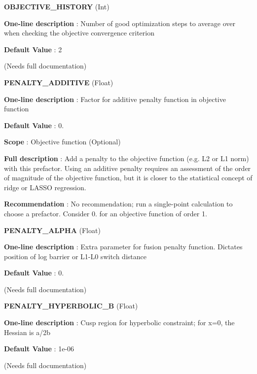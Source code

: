 \begin{DoxyItemize}
\item {\bfseries  O\-B\-J\-E\-C\-T\-I\-V\-E\-\_\-\-H\-I\-S\-T\-O\-R\-Y } (Int) \par
{\bfseries  One-\/line description }\-: Number of good optimization steps to average over when checking the objective convergence criterion \par
{\bfseries  Default Value }\-: 2 \par
(Needs full documentation)\end{DoxyItemize}
\begin{DoxyItemize}
\item {\bfseries  P\-E\-N\-A\-L\-T\-Y\-\_\-\-A\-D\-D\-I\-T\-I\-V\-E } (Float) \par
{\bfseries  One-\/line description }\-: Factor for additive penalty function in objective function \par
{\bfseries  Default Value }\-: 0. \par
{\bfseries  Scope }\-: Objective function (Optional) \par
{\bfseries  Full description }\-: Add a penalty to the objective function (e.\-g. L2 or L1 norm) with this prefactor. Using an additive penalty requires an assessment of the order of magnitude of the objective function, but it is closer to the statistical concept of ridge or L\-A\-S\-S\-O regression. \par
{\bfseries  Recommendation }\-: No recommendation; run a single-\/point calculation to choose a prefactor. Consider 0. for an objective function of order 1.\end{DoxyItemize}
\begin{DoxyItemize}
\item {\bfseries  P\-E\-N\-A\-L\-T\-Y\-\_\-\-A\-L\-P\-H\-A } (Float) \par
{\bfseries  One-\/line description }\-: Extra parameter for fusion penalty function. Dictates position of log barrier or L1-\/\-L0 switch distance \par
{\bfseries  Default Value }\-: 0. \par
(Needs full documentation)\end{DoxyItemize}
\begin{DoxyItemize}
\item {\bfseries  P\-E\-N\-A\-L\-T\-Y\-\_\-\-H\-Y\-P\-E\-R\-B\-O\-L\-I\-C\-\_\-\-B } (Float) \par
{\bfseries  One-\/line description }\-: Cusp region for hyperbolic constraint; for x=0, the Hessian is a/2b \par
{\bfseries  Default Value }\-: 1e-\/06 \par
(Needs full documentation)\end{DoxyItemize}
